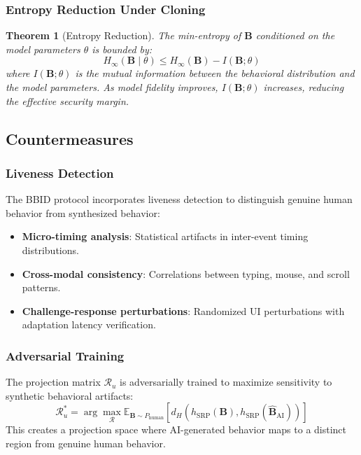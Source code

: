 \documentclass[11pt,twoside]{amsart}
\theoremstyle{plain}
\newtheorem{theorem}{Theorem}[section]
\theoremstyle{definition}
\theoremstyle{remark}
\newcommand{\bB}{\mathbf{B}}
\newcommand{\calR}{\mathcal{R}}
\begin{document}
\subsubsection{Entropy Reduction Under Cloning}

\begin{theorem}[Entropy Reduction]
\label{thm:entropy}
The min-entropy of $\bB$ conditioned on the model parameters $\theta$ is bounded by:
\begin{equation}
H_\infty(\bB \mid \theta) \leq H_\infty(\bB) - I(\bB; \theta)
\end{equation}
where $I(\bB; \theta)$ is the mutual information between the behavioral distribution and the model parameters. As model fidelity improves, $I(\bB; \theta)$ increases, reducing the effective security margin.
\end{theorem}

\subsection{Countermeasures}

\subsubsection{Liveness Detection}

The BBID protocol incorporates liveness detection to distinguish genuine human behavior from synthesized behavior:
\begin{itemize}
    \item \textbf{Micro-timing analysis}: Statistical artifacts in inter-event timing distributions.
    \item \textbf{Cross-modal consistency}: Correlations between typing, mouse, and scroll patterns.
    \item \textbf{Challenge-response perturbations}: Randomized UI perturbations with adaptation latency verification.
\end{itemize}

\subsubsection{Adversarial Training}

The projection matrix $\calR_u$ is adversarially trained to maximize sensitivity to synthetic behavioral artifacts:
\begin{equation}
\calR_u^* = \arg\max_{\calR} \mathbb{E}_{\bB \sim P_{\text{human}}} \left[d_H(h_{\text{SRP}}(\bB), h_{\text{SRP}}(\hat{\bB}_{\text{AI}}))\right]
\end{equation}
This creates a projection space where AI-generated behavior maps to a distinct region from genuine human behavior.
\end{document}
